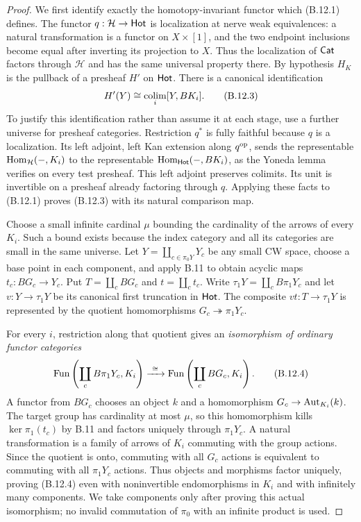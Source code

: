 \begin{proof}
We first identify exactly the homotopy-invariant functor
which (B.12.1) defines. The functor
$q:\mathcal H\to\mathsf{Hot}$ is localization at nerve weak
equivalences: a natural transformation is a functor on
$X\times[1]$, and the two endpoint inclusions become
equal after inverting its projection to $X$. Thus the
localization of $\mathsf{Cat}$ factors through $\mathcal H$
and has the same universal property there.
By hypothesis $H_K$ is the pullback of a presheaf $H'$
on $\mathsf{Hot}$. There is a canonical identification
\[
 H'(Y)\cong\operatorname*{colim}_i[Y,BK_i].
 \tag{B.12.3}
\]
To justify this identification rather than assume it at
each stage, use a further universe for presheaf categories.
Restriction $q^*$ is fully faithful because $q$ is a
localization. Its left adjoint, left Kan extension along
$q^{\mathrm{op}}$, sends the representable
$\operatorname{Hom}_{\mathcal H}(-,K_i)$ to the representable
$\operatorname{Hom}_{\mathsf{Hot}}(-,BK_i)$, as the Yoneda lemma verifies on
every test presheaf. This left adjoint preserves colimits.
Its unit is invertible on a presheaf already factoring
through $q$. Applying these facts to (B.12.1) proves
(B.12.3) with its natural comparison map.

Choose a small infinite cardinal $\mu$ bounding the
cardinality of the arrows of every $K_i$. Such a bound
exists because the index category and all its categories
are small in the same universe. Let
$Y=\coprod_{c\in\pi_0Y}Y_c$ be any small CW space,
choose a base point in each component, and apply B.11 to
obtain acyclic maps $t_c:BG_c\to Y_c$. Put
$T=\coprod_cBG_c$ and $t=\coprod_ct_c$. Write
$\tau_1Y=\coprod_cB\pi_1Y_c$ and let
$v:Y\to\tau_1Y$ be its canonical first truncation in
$\mathsf{Hot}$. The composite $vt:T\to\tau_1Y$ is represented
by the quotient homomorphisms
$G_c\twoheadrightarrow\pi_1Y_c$.

For every $i$, restriction along that quotient gives an
\emph{isomorphism of ordinary functor categories}
\[
 \operatorname{Fun}\left(\coprod_cB\pi_1Y_c,K_i\right)
 \xrightarrow{\ \cong\ }
 \operatorname{Fun}\left(\coprod_cBG_c,K_i\right).
 \tag{B.12.4}
\]
A functor from $BG_c$ chooses an object $k$ and a
homomorphism $G_c\to\operatorname{Aut}_{K_i}(k)$. The target group
has cardinality at most $\mu$, so this homomorphism kills
$\ker\pi_1(t_c)$ by B.11 and factors uniquely through
$\pi_1Y_c$. A natural transformation is a family of
arrows of $K_i$ commuting with the group actions. Since
the quotient is onto, commuting with all $G_c$ actions
is equivalent to commuting with all $\pi_1Y_c$ actions.
Thus objects and morphisms factor uniquely, proving
(B.12.4) even with noninvertible endomorphisms in $K_i$
and with infinitely many components. We take components
only after proving this actual isomorphism; no invalid
commutation of $\pi_0$ with an infinite product is used.


\end{proof}
